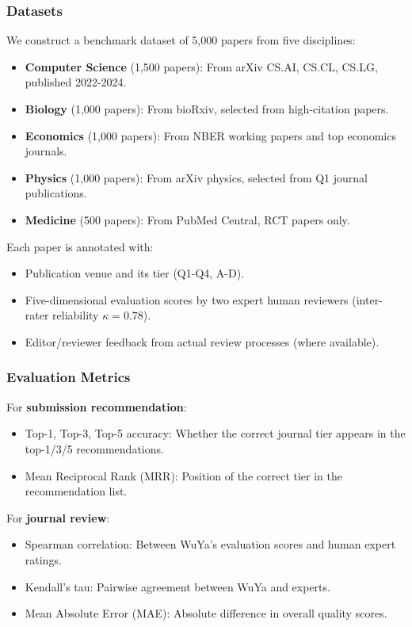 \documentclass[11pt,a4paper]{article}
\begin{document}
\subsubsection{Datasets}

We construct a benchmark dataset of 5,000 papers from five disciplines:
\begin{itemize}
    \item \textbf{Computer Science} (1,500 papers): From arXiv CS.AI, CS.CL, CS.LG, published 2022-2024.
    \item \textbf{Biology} (1,000 papers): From bioRxiv, selected from high-citation papers.
    \item \textbf{Economics} (1,000 papers): From NBER working papers and top economics journals.
    \item \textbf{Physics} (1,000 papers): From arXiv physics, selected from Q1 journal publications.
    \item \textbf{Medicine} (500 papers): From PubMed Central, RCT papers only.
\end{itemize}

Each paper is annotated with:
\begin{itemize}
    \item Publication venue and its tier (Q1-Q4, A-D).
    \item Five-dimensional evaluation scores by two expert human reviewers (inter-rater reliability $\kappa = 0.78$).
    \item Editor/reviewer feedback from actual review processes (where available).
\end{itemize}

\subsubsection{Evaluation Metrics}

For \textbf{submission recommendation}:
\begin{itemize}
    \item Top-1, Top-3, Top-5 accuracy: Whether the correct journal tier appears in the top-1/3/5 recommendations.
    \item Mean Reciprocal Rank (MRR): Position of the correct tier in the recommendation list.
\end{itemize}

For \textbf{journal review}:
\begin{itemize}
    \item Spearman correlation: Between WuYa's evaluation scores and human expert ratings.
    \item Kendall's tau: Pairwise agreement between WuYa and experts.
    \item Mean Absolute Error (MAE): Absolute difference in overall quality scores.
\end{itemize}
\end{document}
